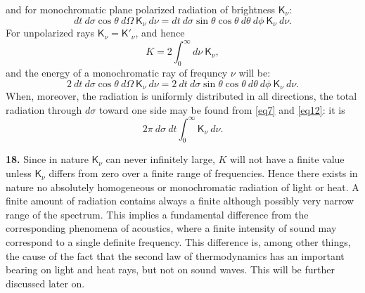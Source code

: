 \documentclass[12pt,oneside]{book}
\begin{document}
and for monochromatic plane polarized radiation of brightness $\mathsf{K}_\nu$:
\begin{equation}
    dt\ d\sigma \cos\theta\ d\Omega\ \mathsf{K}_\nu\ d\nu=dt\ d\sigma \sin\theta \cos\theta\ d\theta\ d\phi\ \mathsf{K}_\nu\ d\nu.
    \label{eq11}
\end{equation}
For unpolarized rays $\mathsf{K}_\nu=\mathsf{K}'_\nu$, and hence 
\begin{equation}
    K=2\int_0^\infty d\nu\ \mathsf{K}_\nu,
    \label{eq12}
\end{equation}
and the energy of a monochromatic ray of frequncy $\nu$ will be:
\begin{equation}
    2\ dt\ d\sigma \cos\theta\ d\Omega\ \mathsf{K}_\nu\ d\nu=2\ dt\ d\sigma \sin\theta \cos\theta\ d\theta\ d\phi\ \mathsf{K}_\nu\ d\nu.
    \label{eq13}
\end{equation}
When, moreover, the radiation is uniformly distributed in all directions, the total radiation through $d\sigma$ toward one side may be found from \eqref{eq7} and \eqref{eq12}: it is 
\begin{equation}
    2\pi\ d\sigma\ dt \int_0^\infty \mathsf{K}_\nu\ d\nu.
    \label{eq14}
\end{equation} \par 

\textbf{18.} Since in nature $\mathsf{K}_\nu$ can never infinitely large, $K$ will not have a finite value unless $\mathsf{K}_\nu$ differs from zero over a finite range of frequencies. Hence there exists in nature no absolutely homogeneous or monochromatic radiation of light or heat. A finite amount of radiation contains always a finite although possibly very narrow range of the spectrum. This implies a fundamental difference from the corresponding phenomena of acoustics, where a finite intensity of sound may correspond to a single definite frequency. This difference is, among other things, the cause of the fact that the second law of thermodynamics has an important bearing on light and heat rays, but not on sound waves. This will be further discussed later on. \par 
\end{document}
